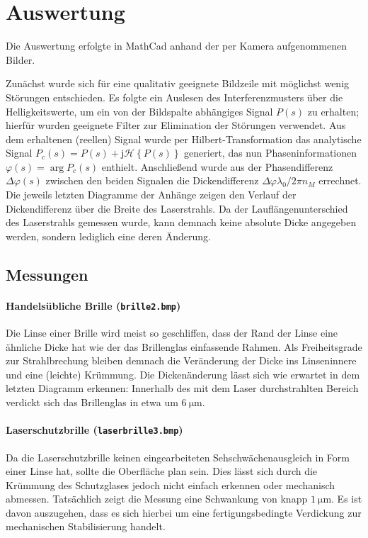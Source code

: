 \section{Auswertung}

Die Auswertung erfolgte in MathCad anhand der per Kamera aufgenommenen Bilder.

Zunächst wurde sich für eine qualitativ geeignete Bildzeile mit möglichst wenig Störungen entschieden. Es folgte ein Auslesen des Interferenzmusters über die Helligkeitswerte, um ein von der Bildspalte abhängiges Signal $P(s)$ zu erhalten; hierfür wurden geeignete Filter zur Elimination der Störungen verwendet. Aus dem erhaltenen (reellen) Signal wurde per Hilbert-Transformation das analytische Signal $P_c(s) = P(s) + \mathrm j \mathcal H\left\lbrace P(s) \right\rbrace$ generiert, das nun Phaseninformationen $\varphi(s)=\arg P_c(s)$ enthielt. Anschließend wurde aus der Phasendifferenz $\Delta\varphi(s)$  zwischen den beiden Signalen die Dickendifferenz $\Delta\varphi\lambda_0 / 2\pi n_M$ errechnet. Die jeweils letzten Diagramme der Anhänge zeigen den Verlauf der Dickendifferenz über die Breite des Laserstrahls. Da der Lauflängenunterschied des Laserstrahls gemessen wurde, kann demnach keine absolute Dicke angegeben werden, sondern lediglich eine deren Änderung.

\subsection{Messungen}

\paragraph{Handelsübliche Brille (\texttt{brille2.bmp})}

Die Linse einer Brille wird meist so geschliffen, dass der Rand der Linse eine ähnliche Dicke hat wie der das Brillenglas einfassende Rahmen. Als Freiheitsgrade zur Strahlbrechung bleiben demnach die Veränderung der Dicke ins Linseninnere und eine (leichte) Krümmung.
Die Dickenänderung lässt sich wie erwartet in dem letzten Diagramm erkennen: Innerhalb des mit dem Laser durchstrahlten Bereich verdickt sich das Brillenglas in etwa um $\SI{6}{\micro\meter}$.
 
\paragraph{Laserschutzbrille (\texttt{laserbrille3.bmp})}
Da die Laserschutzbrille keinen eingearbeiteten Sehschwächenausgleich in Form einer Linse hat, sollte die Oberfläche plan sein. Dies lässt sich durch die Krümmung des Schutzglases jedoch nicht einfach erkennen oder mechanisch abmessen. 
Tatsächlich zeigt die Messung eine Schwankung von knapp $\SI{1}{\micro\meter}$. Es ist davon auszugehen, dass es sich hierbei um eine fertigungsbedingte Verdickung zur mechanischen Stabilisierung handelt.

